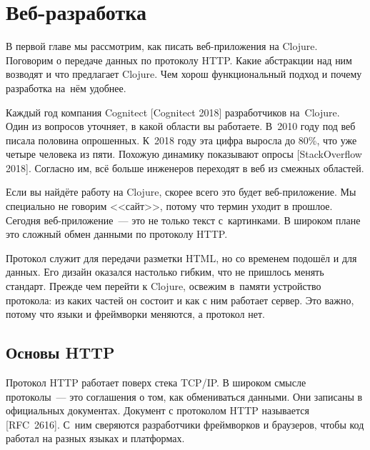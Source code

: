 \chapter{Веб-разработка}

\begin{teaser}
В первой главе мы рассмотрим, как писать веб-приложения на Clojure. Поговорим о
передаче данных по протоколу HTTP. Какие абстракции над ним возводят и что
предлагает Clojure. Чем хорош функциональный подход и почему разработка на~нём
удобнее.
\end{teaser}


Каждый год компания Cognitect
[Cognitect 2018]
разработчиков на~Clojure. Один из вопросов уточняет, в какой области вы
работаете. В~2010 году под веб писала половина опрошенных. К~2018 году эта цифра
выросла до 80\%, что уже четыре человека из пяти. Похожую динамику показывают опросы
[Stack\-Overflow 2018].
Согласно им, всё больше инженеров переходят в веб из смежных областей.

Если вы найдёте работу на Clojure, скорее всего это будет веб-при\-ло\-же\-ние. Мы
специально не говорим <<сайт>>, потому что термин уходит в прошлое. Сегодня
веб-приложение~--- это не только текст с~картинками. В широком плане это сложный
обмен данными по протоколу HTTP.

Протокол служит для передачи разметки HTML, но со временем подошёл и для
данных. Его дизайн оказался настолько гибким, что не пришлось менять
стандарт. Прежде чем перейти к Clojure, освежим в~памяти устройство протокола:
из каких частей он состоит и как с ним работает сервер. Это важно, потому что
языки и фреймворки меняются, а протокол нет.

\section{Основы HTTP}


Протокол HTTP работает поверх стека TCP/IP. В широком смысле протоколы~--- это
соглашения о том, как обмениваться данными. Они записаны в официальных
документах. Документ с протоколом HTTP называется
[RFC~2616]. С~ним
сверяются разработчики фреймворков и браузеров, чтобы код работал на разных
языках и платформах.

